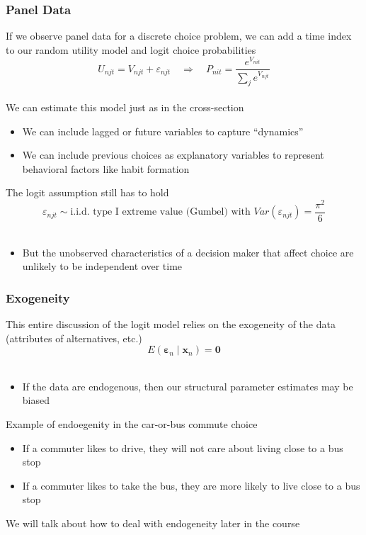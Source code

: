 \documentclass{beamer}\usepackage[]{graphicx}\usepackage[]{color}
\begin{document}
\begin{frame}\frametitle{Panel Data}
    If we observe panel data for a discrete choice problem, we can add a time index to our random utility model and logit choice probabilities
    $$U_{njt} = V_{njt} + \varepsilon_{njt} \quad \Rightarrow \quad P_{nit} = \frac{e^{V_{nit}}}{\sum_j e^{V_{njt}}}$$ \\
    \vspace{2ex}
    We can estimate this model just as in the cross-section
    \begin{itemize}
        \item We can include lagged or future variables to capture ``dynamics''
        \item We can include previous choices as explanatory variables to represent behavioral factors like habit formation
    \end{itemize}
    \vspace{2ex}
    The logit assumption still has to hold
    $$\varepsilon_{njt} \sim \text{i.i.d.\ type I extreme value (Gumbel) with } Var(\varepsilon_{njt}) = \frac{\pi^2}{6}$$ \\
    \begin{itemize}
        \item But the unobserved characteristics of a decision maker that affect choice are unlikely to be independent over time
    \end{itemize}
\end{frame}

\begin{frame}\frametitle{Exogeneity}
    This entire discussion of the logit model relies on the exogeneity of the data (attributes of alternatives, etc.)
    $$E(\bm{\varepsilon}_n \mid \bm{x}_n) = \bm{0}$$ \\
    \begin{itemize}
        \item If the data are endogenous, then our structural parameter estimates may be biased
    \end{itemize}
    \vspace{2ex}
    Example of endoegenity in the car-or-bus commute choice
    \begin{itemize}
        \item If a commuter likes to drive, they will not care about living close to a bus stop
        \item If a commuter likes to take the bus, they are more likely to live close to a bus stop
    \end{itemize}
    \vspace{2ex}
    We will talk about how to deal with endogeneity later in the course
\end{frame}
\end{document}
